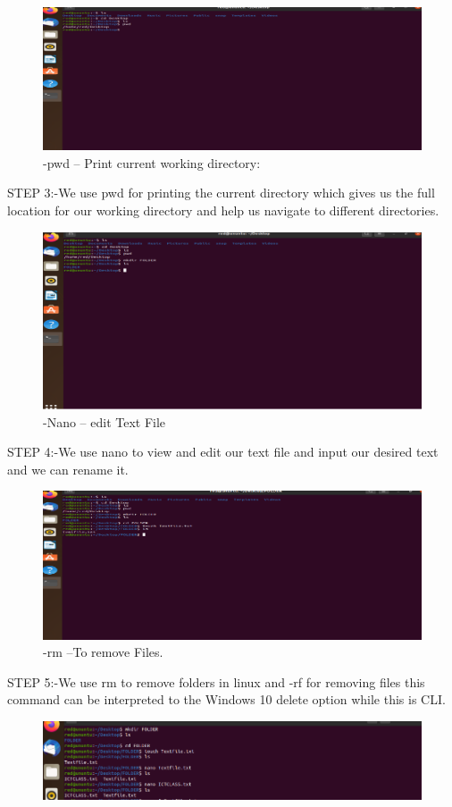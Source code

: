 \documentclass[a4paper,9pt]{article}
\begin{document}
\begin{enumerate}
	\begin{figure}[H]
		\centering
		\includegraphics[width=0.8\linewidth]{3.3.png}
		\caption{-pwd – Print current working directory:}
	\end{figure}
	STEP 3:-We use pwd for printing the current directory which gives us the full location for
	our working directory and help us navigate to different directories.
	\begin{figure}[H]
		\centering
		\includegraphics[width=0.8\linewidth]{3.4.png}
		\caption{-Nano – edit Text File}
	\end{figure}
	STEP 4:-We use nano to view and edit our text file and input our desired text and we can rename it.
	\begin{figure}[H]
		\centering
		\includegraphics[width=0.8\linewidth]{3.5.png}
		\caption{-rm –To remove Files.}
	\end{figure}
	STEP 5:-We use rm to remove folders in linux and -rf for removing files this command can be
	interpreted to the Windows 10 delete option while this is CLI.
	\begin{figure}[H]
		\centering
		\includegraphics[width=0.8\linewidth]{3.6.png}

\end{figure}
\end{enumerate}
\end{document}
